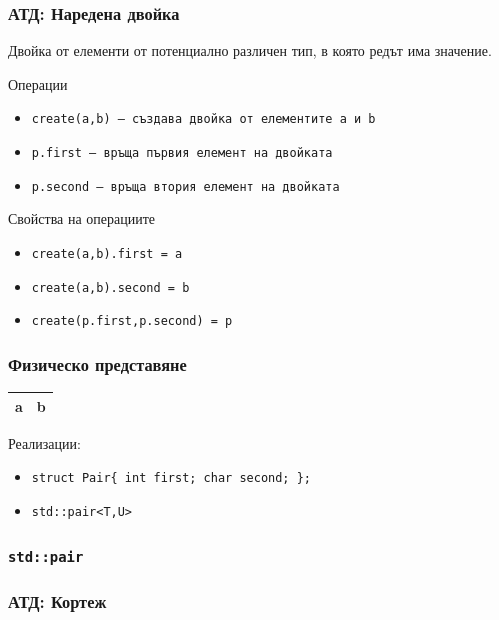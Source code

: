 \documentclass{beamer}
\begin{document}
\begin{frame}
  \frametitle{АТД: Наредена двойка}

  Двойка от елементи от потенциално различен тип, в която редът има значение.

  Операции
  \begin{itemize}
  \item \tt{create(a,b)} --- създава двойка от елементите \tt a и \tt b
  \item \tt{p.first} --- връща първия елемент на двойката
  \item \tt{p.second} --- връща втория елемент на двойката
  \end{itemize}

  Свойства на операциите
  \begin{itemize}
  \item \tt{create(a,b).first} = \tt a
  \item \tt{create(a,b).second} = \tt b
  \item \tt{create(p.first,p.second)} = \tt p
  \end{itemize}
\end{frame}

\begin{frame}[fragile]
  \frametitle{Физическо представяне}

  \begin{center}
    \begin{tabular}{|m{3ex}|m{5ex}|}
      \hline
      \rowcolor{blue!60!green!40}
      \centering a&\centering b\\
      \hline
    \end{tabular}
  \end{center}
  \vspace{2em}

  Реализации:
  \begin{itemize}
  \item \verb#struct Pair{ int first; char second; };#
  \item \verb#std::pair<T,U>#
  \end{itemize}
\end{frame}

\begin{frame}
  \frametitle{\tt{std::pair}}
\end{frame}

\begin{frame}
  \frametitle{АТД: Кортеж}
\end{frame}
\end{document}
